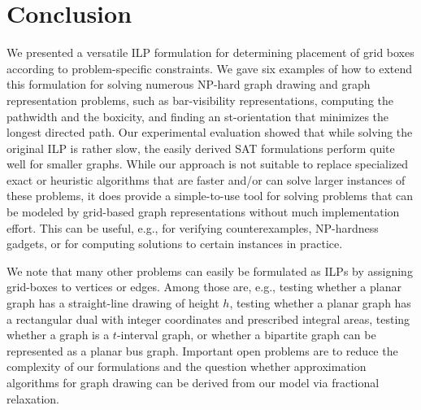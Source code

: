 \documentclass[runningheads]{llncs}
\newcounter{constr}
\begin{document}
\section{Conclusion}
We presented a versatile ILP formulation for determining placement of
grid boxes according to problem-specific constraints. We gave six
examples of how to extend this formulation for solving numerous
NP-hard graph drawing and graph representation problems, such as
bar-visibility representations, computing the pathwidth and the
boxicity, and finding an st-orientation that minimizes the
longest directed path. Our experimental evaluation showed that while solving the original ILP is rather slow, the easily derived SAT formulations perform quite well for smaller graphs. While our approach is not suitable to replace specialized exact or heuristic algorithms that are faster and/or can solve larger instances of these problems, it does provide a simple-to-use tool for solving problems that can be modeled by grid-based graph representations without much implementation effort. This can be useful, e.g., for verifying counterexamples, NP-hardness gadgets, or for computing solutions to certain instances in practice.

We note that many other problems can easily be formulated as ILPs by assigning
grid-boxes to vertices or edges.  Among those are, e.g., testing
whether a planar graph has a straight-line drawing of height $h$,
testing whether a planar graph has a rectangular dual with
integer coordinates and prescribed integral areas, testing whether a graph is a $t$-interval graph, or whether a  bipartite graph can be represented as a planar bus graph. 
Important open problems are to reduce the complexity of our formulations and the question whether approximation algorithms for graph drawing can be derived from our model via fractional relaxation. 


{\small
  
  
}
\end{document}
